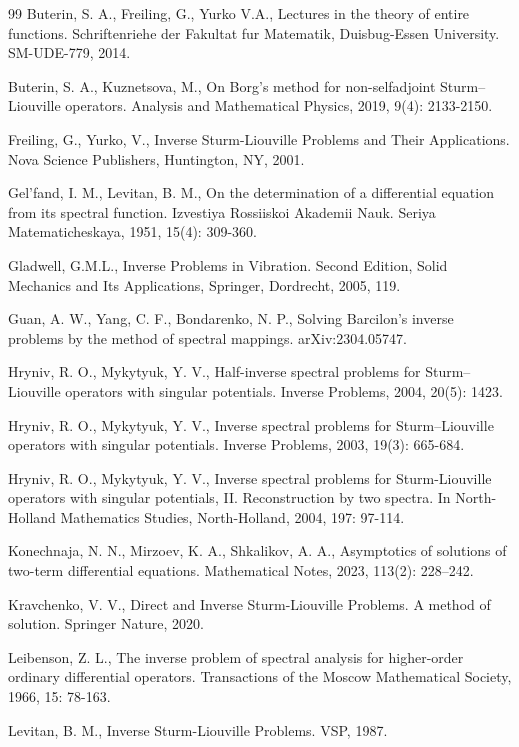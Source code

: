 \documentclass[reqno,12pt,centertags]{amsart}
\numberwithin{equation}{section}
\theoremstyle{definition}
\begin{document}
\begin{thebibliography}{99}
 Buterin, S. A., Freiling, G., Yurko V.\;A., Lectures in the theory of entire functions. Schriftenriehe der Fakultat fur Matematik, Duisbug-Essen University. SM-UDE-779, 2014.

 Buterin, S. A., Kuznetsova, M., On Borg’s method for non-selfadjoint Sturm–Liouville operators. Analysis and Mathematical Physics, 2019, 9(4): 2133-2150.

 Freiling, G., Yurko, V., Inverse Sturm-Liouville Problems and Their Applications. Nova Science Publishers, Huntington, NY, 2001.

Gel'fand, I. M., Levitan, B. M., On the determination of a differential equation from its spectral function. Izvestiya Rossiiskoi Akademii Nauk. Seriya Matematicheskaya, 1951, 15(4): 309-360.

 Gladwell, G.M.L., Inverse Problems in Vibration. Second Edition, Solid Mechanics and Its Applications, Springer, Dordrecht, 2005, 119.

 Guan, A. W., Yang, C. F., Bondarenko, N. P., Solving Barcilon's inverse problems by the method of spectral mappings. 	arXiv:2304.05747.

 Hryniv, R. O., Mykytyuk, Y. V., Half-inverse spectral problems for Sturm–Liouville operators with singular potentials. Inverse Problems, 2004, 20(5): 1423.


 Hryniv, R. O., Mykytyuk, Y. V., Inverse spectral problems for Sturm–Liouville operators with singular potentials. Inverse Problems, 2003, 19(3): 665-684.

 Hryniv, R. O., Mykytyuk, Y. V., Inverse spectral problems for Sturm-Liouville operators with singular potentials, II. Reconstruction by two spectra. In North-Holland Mathematics Studies, North-Holland, 2004, 197: 97-114.

Konechnaja, N. N., Mirzoev, K. A., Shkalikov, A. A., Asymptotics of solutions of two-term differential equations. Mathematical Notes, 2023, 113(2): 228–242.

 Kravchenko, V. V., Direct and Inverse Sturm-Liouville Problems. A method of solution. Springer Nature, 2020.	

Leibenson, Z. L., The inverse problem of spectral analysis for higher-order ordinary differential operators. Transactions of the Moscow Mathematical Society, 1966, 15: 78-163.

Levitan, B. M., Inverse Sturm-Liouville Problems. VSP, 1987.


\end{thebibliography}
\end{document}
